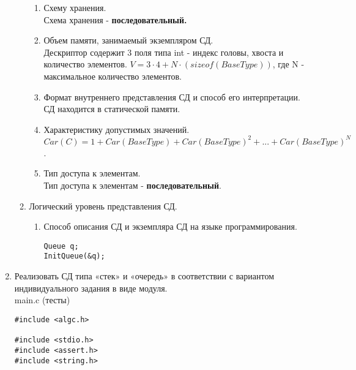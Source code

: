 \documentclass[a4paper,14pt]{extarticle}
\begin{document}
\begin{enumerate}
\begin{enumerate}[label*=\arabic*.]
                    \begin{enumerate}[label*=\arabic*.]
                        \item Схему хранения.\\
                              Схема хранения - \textbf{последовательный.}
                        \item Объем памяти, занимаемый экземпляром СД.\\
                              Дескриптор содержит 3 поля типа int - индекс головы, хвоста и количество элементов.
                              $V = 3 \cdot 4 + N\cdot(sizeof(BaseType))$, где N - максимальное количество элементов.
                        \item Формат внутреннего представления СД и способ его интерпретации.\\
                              СД находится в статической памяти.
                        \item Характеристику допустимых значений.\\
                              $Car(C) = 1 + Car(BaseType) + Car(BaseType) ^ 2 + ... + Car(BaseType) ^ {N}$.
                        \item Тип доступа к элементам.\\
                              Тип доступа к элементам - \textbf{последовательный}.
                    \end{enumerate}

              \item Логический уровень представления СД.
                    \begin{enumerate}[label*=\arabic*.]
                        \item Способ описания СД и экземпляра СД на языке программирования.\\
                              \begin{verbatim}
Queue q;
InitQueue(&q);
												  \end{verbatim}
                    \end{enumerate}
          \end{enumerate}
    \item Реализовать СД типа «стек» и «очередь» в соответствии с вариантом
          индивидуального задания в виде модуля.\\
          main.c (тесты)
          \begin{verbatim}
#include <algc.h>

#include <stdio.h>
#include <assert.h>
#include <string.h>


\end{verbatim}
\end{enumerate}
\end{document}
